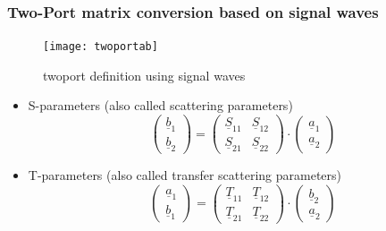 \documentclass[10pt]{report}
\begin{document}
\subsubsection{Two-Port matrix conversion based on signal waves}

\begin{figure}[ht]
\begin{center}
\texttt{[image: twoportab]}
\end{center}
\caption{twoport definition using signal waves}
\label{fig:twoportab}
\end{figure}
\FloatBarrier

\begin{itemize}

\item S-parameters (also called scattering parameters)
\begin{equation}
\begin{pmatrix}
\underline{b}_{1}\\
\underline{b}_{2}
\end{pmatrix}
=
\begin{pmatrix}
\underline{S}_{11} & \underline{S}_{12}\\
\underline{S}_{21} & \underline{S}_{22}
\end{pmatrix}
\cdot
\begin{pmatrix}
\underline{a}_{1}\\
\underline{a}_{2}
\end{pmatrix}
\end{equation}

\item T-parameters (also called transfer scattering parameters)
\begin{equation}
\begin{pmatrix}
\underline{a}_{1}\\
\underline{b}_{1}
\end{pmatrix}
=
\begin{pmatrix}
\underline{T}_{11} & \underline{T}_{12}\\
\underline{T}_{21} & \underline{T}_{22}
\end{pmatrix}
\cdot
\begin{pmatrix}
\underline{b}_{2}\\
\underline{a}_{2}
\end{pmatrix}
\end{equation}

\end{itemize}
\end{document}
